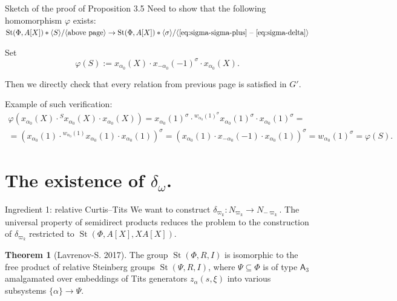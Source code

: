 \documentclass{beamer} %
\DeclareMathOperator{\St}{St}
\newcommand{\rA}{\mathsf{A}}
\theoremstyle{definition}
\newtheorem*{thm}{Theorem}
\begin{document}
\begin{frame}{Sketch of the proof of Proposition 3.5}
Need to show that the following homomorphism $\varphi$ exists:
$\St(\Phi, A[X]) * \langle S \rangle / \langle\text{above page}\rangle \to \St(\Phi, A[X]) * \langle \sigma \rangle / \langle \eqref{eq:sigma-sigma-plus}\text{ -- }\eqref{eq:sigma-delta} \rangle$

\pause Set
\[\varphi(S) := x_{\alpha_0}(X) \cdot x_{-\alpha_0}(-1)^\sigma \cdot x_{\alpha_0}(X).\]

\pause Then we directly check that every relation from previous page is satisfied in $G'$.

\medskip \pause 
Example of such verification:
\scriptsize
\begin{multline*}
\varphi(x_{\alpha_0}(X) \cdot {}^{S} x_{\alpha_0}(X) \cdot x_{\alpha_0}(X)) = x_{\alpha_0}(1)^\sigma \cdot {}^{w_{\alpha_0}(1)^\sigma} x_{\alpha_0}(1)^\sigma \cdot x_{\alpha_0}(1)^\sigma = \\
= \left( x_{\alpha_0}(1) \cdot {}^{w_{\alpha_0}(1)} x_{\alpha_0}(1) \cdot x_{\alpha_0}(1)\right)^\sigma = \left(x_{\alpha_0}(1) \cdot x_{-\alpha_0}(-1) \cdot x_{\alpha_0}(1)\right)^\sigma = w_{\alpha_0}(1)^\sigma = \varphi(S).
\end{multline*}
\end{frame}

\section{The existence of $\delta_\omega$.}

\begin{frame} \tableofcontents[currentsection] \end{frame}

\begin{frame}{Ingredient 1: relative Curtis--Tits}
We want to construct $\delta_{\varpi_k} \colon N_{\varpi_k} \to N_{-\varpi_k}$.
The universal property of semidirect products reduces the problem to the construction of
$\delta_{\varpi_k}$ restricted to $\St(\Phi, A[X], XA[X])$.

\pause \begin{thm}[Lavrenov-S. 2017] \label{thm:relPres}The group $\St(\Phi, R, I)$ is isomorphic to the free product of relative Steinberg groups $\St(\Psi, R, I)$, where $\Psi \subseteq \Phi$ is of type $\rA_3$ amalgamated over embeddings of Tits generators $z_\alpha(s, \xi)$ into various subsystems $\{\alpha\} \to \Psi$. \end{thm}
\end{frame}
\end{document}

